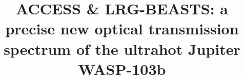 \documentclass[twocolumn]{aastex63}
\begin{document}
\title{ACCESS \& LRG-BEASTS: a precise new optical transmission spectrum of the ultrahot Jupiter WASP-103b}


\end{document}

